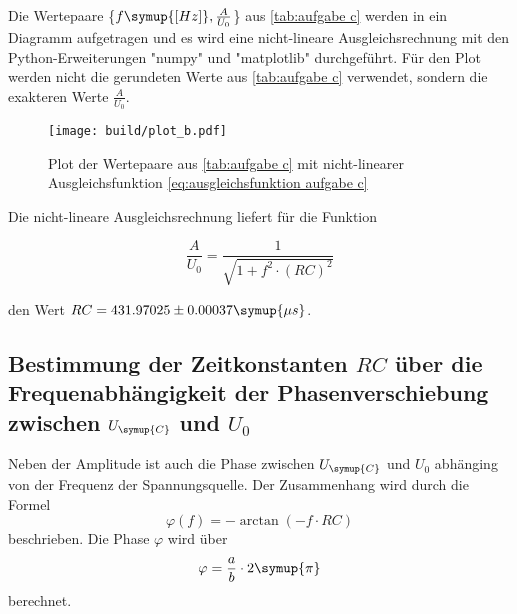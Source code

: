 Die Wertepaare \{$f \symup{[Hz]}, \frac{A}{U_{0}}$\} aus \autoref{tab:aufgabe c} werden in ein Diagramm aufgetragen
und es wird eine nicht-lineare Ausgleichsrechnung mit den Python-Erweiterungen "numpy" \cite{numpy} und 
"matplotlib" \cite{matplotlib} durchgeführt. Für den Plot werden nicht die
gerundeten Werte aus \autoref{tab:aufgabe c} verwendet, sondern die exakteren Werte $\frac{A}{U_{0}}$.

\begin{figure}
  \centering
  \texttt{[image: build/plot\_b.pdf]}
  \caption{Plot der Wertepaare aus \autoref{tab:aufgabe c} mit nicht-linearer Ausgleichsfunktion \autoref{eq:ausgleichsfunktion aufgabe c}}
  \label{fig:plot_b}
\end{figure}

Die nicht-lineare Ausgleichsrechnung liefert für die Funktion 
\begin{figure}[!h]
  \begin{equation}
    \frac{A}{U_{0}} = \frac{1}{\sqrt{1+f^2\cdot (RC)^2}}
    \label{eq:ausgleichsfunktion aufgabe c}
  \end{equation}
\end{figure}

den Wert $RC = 431.97025\pm0.00037\symup{\mu s}$.


\subsection{Bestimmung der Zeitkonstanten $RC$ über die Frequenabhängigkeit der Phasenverschiebung%
 zwischen $U_{\symup{C}}$ und $U_{0}$}
 Neben der Amplitude ist auch die Phase zwischen $U_{\symup{C}}$ und $U_{0}$ abhänging von der Frequenz der Spannungsquelle.
 Der Zusammenhang wird durch die Formel
 \begin{equation}
   \varphi(f) = -\arctan(-f\cdot RC)
   \label{eq:Formel für Phasenverschiebung}
 \end{equation}
 beschrieben. 
Die Phase $\varphi$ wird über
\begin{equation}
  \varphi = \frac{a}{b}\cdot 2\symup{\pi}
\end{equation}
berechnet.

